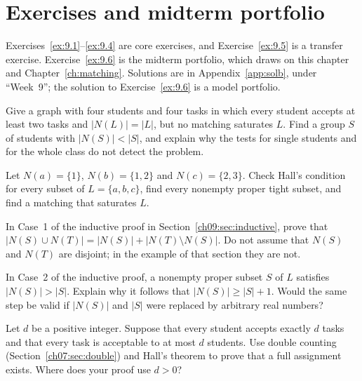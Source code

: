 \section*{Exercises and midterm portfolio}
Exercises~\ref{ex:9.1}--\ref{ex:9.4} are core exercises, and Exercise~\ref{ex:9.5} is a transfer exercise. Exercise~\ref{ex:9.6} is the midterm portfolio, which draws on this chapter and Chapter~\ref{ch:matching}. Solutions are in Appendix~\ref{app:solb}, under ``Week~9''; the solution to Exercise~\ref{ex:9.6} is a model portfolio.
\begin{exercise}\label{ex:9.1}Give a graph with four students and four tasks in which every student accepts at least two tasks and $|N(L)|=|L|$, but no matching saturates $L$. Find a group $S$ of students with $|N(S)|<|S|$, and explain why the tests for single students and for the whole class do not detect the problem.\end{exercise}
\begin{exercise}\label{ex:9.2}Let $N(a)=\{1\}$, $N(b)=\{1,2\}$ and $N(c)=\{2,3\}$. Check Hall's condition for every subset of $L=\{a,b,c\}$, find every nonempty proper tight subset, and find a matching that saturates $L$.\end{exercise}
\begin{exercise}\label{ex:9.3}In Case~1 of the inductive proof in Section~\ref{ch09:sec:inductive}, prove that $|N(S)\cup N(T)|=|N(S)|+|N(T)\setminus N(S)|$. Do not assume that $N(S)$ and $N(T)$ are disjoint; in the example of that section they are not.\end{exercise}
\begin{exercise}\label{ex:9.4}In Case~2 of the inductive proof, a nonempty proper subset $S$ of $L$ satisfies $|N(S)|>|S|$. Explain why it follows that $|N(S)|\ge|S|+1$. Would the same step be valid if $|N(S)|$ and $|S|$ were replaced by arbitrary real numbers?\end{exercise}
\begin{exercise}\label{ex:9.5}Let $d$ be a positive integer. Suppose that every student accepts exactly $d$ tasks and that every task is acceptable to at most $d$ students. Use double counting (Section~\ref{ch07:sec:double}) and Hall's theorem to prove that a full assignment exists. Where does your proof use $d>0$?\end{exercise}
